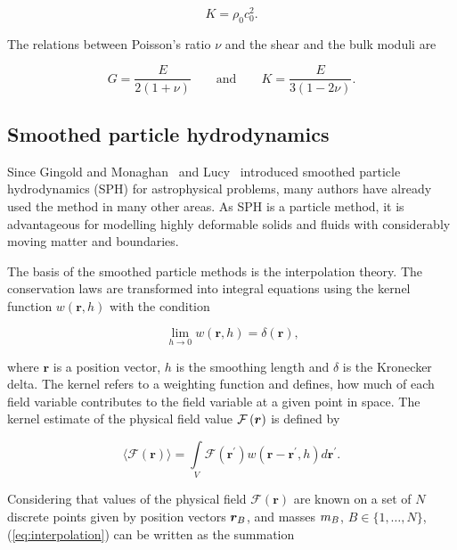 \documentclass{svproc}
\newcommand{\reva}[1]{{\color{black}#1}}
\begin{document}
\begin{equation}
K=\rho_0 c_0^2
\mbox{.}
\end{equation}

The relations between Poisson's ratio $\nu$ and the shear and the bulk moduli are

\begin{equation}
\label{eq:moduli}
G=\frac{E}{2(1+\nu)} \qquad\mbox{and}\qquad K=\frac{E}{3(1-2\nu)}
\mbox{.}
\end{equation}
%
\subsection{Smoothed particle hydrodynamics}
%
Since Gingold and Monaghan~\cite{Gingold:1977} and Lucy~\cite{Lucy:1977} introduced smoothed particle hydrodynamics (SPH) for astrophysical problems, many authors have already used the method in many other areas. As SPH is a particle method, it is advantageous for modelling highly deformable solids and fluids with considerably moving matter and boundaries.

The basis of the smoothed particle methods is the interpolation theory. The conservation laws are transformed into integral equations using the kernel function  $w\left({\bm r}, h\right)$ with the condition

\begin{equation}
\label{eq:limit}
\lim\limits_{h\rightarrow 0}w\left({\bm r}, h\right)=\delta\left({\bm r}\right)
\mbox{,}
\end{equation}

\noindent
where ${\bm r}$ is a position vector, $h$ is the smoothing length and $\delta$ is the Kronecker delta. The kernel refers to a weighting function and defines, how much of each field variable contributes to the field variable at a given point in space. The kernel estimate of the physical field value $\mathcal{\reva{F}}\left({\bm r}\right)$ is defined by

\begin{equation}
\label{eq:interpolation}
\langle\mathcal{F}\left({\bm r}\right)\rangle=\int\limits_V\mathcal{F}\left({\bm r}^\prime\right)w\left({\bm r} - {\bm r}^\prime, h\right)d{\bm r}^\prime
\mbox{.}
\end{equation}

Considering that values of the physical field $\mathcal{F}\left({\bm r}\right)$ are known on a set of $N$ discrete points given by position vectors ${\bm r}_\reva{B}$, and masses $m_\reva{B}$, \reva{$B\in\{1,\dots,N\}$,} (\ref{eq:interpolation}) can be written as the summation
\end{document}
